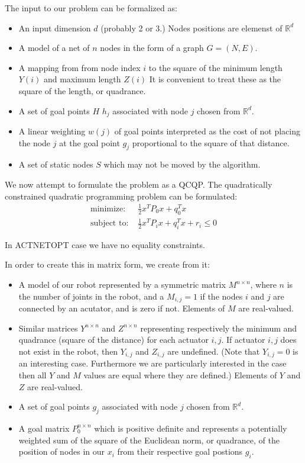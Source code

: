 \documentclass[11pt]{article}
\begin{document}
The input to our problem can be formalized as:
\begin{itemize}
 \item An input dimension $d$ (probably 2 or 3.) Nodes positions are elemenst of $\mathbb{R}^d$
 \item A model of a net of $n$ nodes in the form of a graph $G = (N, E)$.
 \item A mapping from from node index $i$ to the square of the minimum length $Y(i)$ and maximum length $Z(i)$ It is
   convenient to treat these as the square of the length, or quadrance.
\item A set of goal points $H$ $h_j$ associated with node $j$ chosen from $\mathbb{R}^d$.
\item A linear weighting $w(j)$ of goal points interpreted as the cost of not placing the node $j$ at
  the goal point $g_j$ proportional to the square of that distance.
\item A set of static nodes $S$ which may not be moved by the algorithm.
\end{itemize}

We now attempt to formulate the problem as a QCQP.
The quadratically constrained quadratic programming problem can be formulated:
\begin{align*}
\text{minimize: }  & \frac{1}{2} x^TP_0x + q_0^Tx \\
\text{subject to: } & \frac{1}{2} x^TP_ix + q_i^Tx + r_i \leq 0
\end{align*}

In ACTNETOPT case we have no equality constraints.

In order to create this in matrix form, we create from it:
\begin{itemize}
\item A model of our robot represented by a symmetric matrix $M^{n \times n}$, where $n$ is the number of joints in the robot, and
  a $M_{i,j} = 1$ if the nodes $i$ and $j$ are connected by an acutator, and is zero if not. Elements of $M$ are real-valued.
\item Similar matrices $Y^{n \times n}$ and $Z^{n \times n}$ representing respectively the minimum and quadrance (square of the distance) for each actuator $i,j$.
  If actuator $i,j$ does not exist in the robot, then $Y_{i,j}$ and $Z_{i,j}$ are undefined. (Note that $Y_{i,j} = 0$ is an interesting case. Furthermore
  we are particularly interested in the case then all $Y$ and $M$ values are equal where they are defined.) Elements of $Y$ and $Z$ are real-valued.
\item A set of goal points $g_j$ associated with node $j$ chosen from $\mathbb{R}^d$.
\item A goal matrix $P_0^{n \times n}$ which is positive definite and represents a potentially weighted sum of the square of the Euclidean norm, or quadrance,
  of the position of nodes in our $x_i$ from their respective goal postions $g_i$.
\end{itemize}
\end{document}
